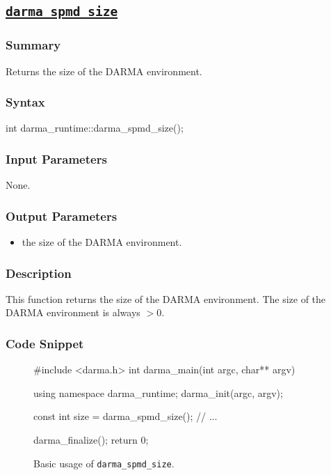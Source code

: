 


\clearpage

\subsection{\underline{\texttt{darma\_spmd\_size}}}

\hspace{0.1cm} %
\begin{subs}
\vspace{-1.2cm}

\subsubsection{Summary} 
Returns the size of the DARMA environment.

\subsubsection{Syntax}
\begin{CppCode}
int darma_runtime::darma_spmd_size();
\end{CppCode}

\subsubsection{Input Parameters} 
None. 

\subsubsection{Output Parameters} 
\begin{itemize}
\item the size of the DARMA environment.
\end{itemize}

\subsubsection{Description} 
This function returns the size of the DARMA environment. 
The size of the DARMA environment is always $>0$.

\subsubsection{Code Snippet} 
\begin{figure}[!h]
\begin{CppCodeNumb}
#include <darma.h>
int darma_main(int argc, char** argv)
{
  using namespace darma_runtime;
  darma_init(argc, argv);

  const int size = darma_spmd_size();
  // ...

  darma_finalize();
  return 0;
}
\end{CppCodeNumb}
\label{fig:fe_api_ranksize}
\caption{Basic usage of \texttt{darma\_spmd\_size}.}
\end{figure}


\end{subs}





